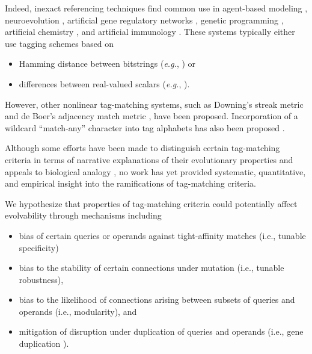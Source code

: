 Indeed, inexact referencing techniques find common use in agent-based modeling \citep{riolo2001evolution}, neuroevolution \citep{reisinger2007acquiring}, artificial gene regulatory networks \citep{banzhaf2003artificial}, genetic programming \citep{spector2011tag, lalejini2018evolving}, artificial chemistry \citep{dittrich2001artificial}, and artificial immunology \citep{timmis2008theoretical}.
These systems typically either use tagging schemes based on
\begin{itemize}
    \item Hamming distance between bitstrings (\textit{e.g.}, \cite{lalejini2018evolving,banzhaf2003artificial}) or
    \item differences between real-valued scalars (\textit{e.g.}, \cite{riolo2001evolution,spector2011tag}).
\end{itemize}
However, other nonlinear tag-matching systems, such as Downing's streak metric \citep{downing2015intelligence} and de Boer's adjacency match metric \citep{DEBOER1991381}, have been proposed.
Incorporation of a wildcard ``match-any'' character into tag alphabets has also been proposed \citep{holland2012signals}.

Although some efforts have been made to distinguish certain tag-matching criteria in terms of narrative explanations of their evolutionary properties and appeals to biological analogy \citep{downing2015intelligence,scherer2004activation}, no work has yet provided systematic, quantitative, and empirical insight into the ramifications of tag-matching criteria.

We hypothesize that properties of tag-matching criteria could potentially affect evolvability through mechanisms including
\begin{itemize}
  \item bias of certain queries or operands against tight-affinity matches (i.e., tunable specificity)
  \item bias to the stability of certain connections under mutation (i.e., tunable robustness),
  \item bias to the likelihood of connections arising between subsets of queries and operands (i.e., modularity), and
  \item mitigation of disruption under duplication of queries and operands (i.e., gene duplication \citep{ohno2013evolution, lewis1978gene}).
\end{itemize}

